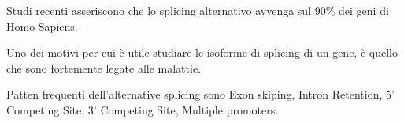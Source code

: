 Studi recenti asseriscono che lo splicing alternativo avvenga sul 90\% dei geni di Homo Sapiens.

Uno dei motivi per cui è utile studiare le isoforme di splicing di un gene, è quello che sono fortemente legate alle malattie.

Patten frequenti dell'alternative splicing sono Exon skiping, Intron Retention, 5' Competing Site, 3' Competing Site, Multiple promoters.

